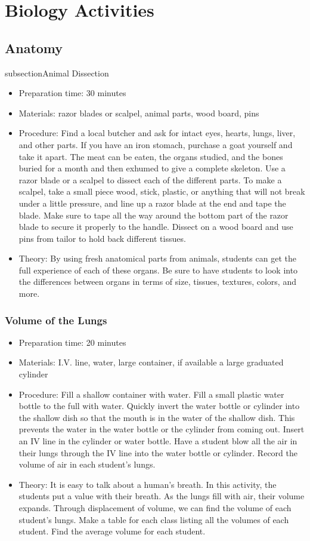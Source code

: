 \chapter{Biology Activities}

\section{Anatomy}

subsection{Animal Dissection}
\begin{itemize}
\item{Preparation time: 30 minutes}
\item{Materials: razor blades or scalpel, animal parts, wood board, pins}
\item{Procedure: Find a local butcher and ask for intact eyes, hearts, lungs, liver, and other parts. If you have an iron stomach, purchase a goat yourself and take it apart. The meat can be eaten, the organs studied, and the bones buried for a month and then exhumed to give a complete skeleton. Use a razor blade or a scalpel to dissect each of the different parts. To make a scalpel, take a small piece wood, stick, plastic, or anything that will not break under a little pressure, and line up a razor blade at the end and tape the blade. Make sure to tape all the way around the bottom part of the razor blade to secure it properly to the handle. Dissect on a wood board and use pins from tailor to hold back different tissues.}
\item{Theory: By using fresh anatomical parts from animals, students can get the full experience of each of these organs. Be sure to have students to look into the differences between organs in terms of size, tissues, textures, colors, and more.}
\end{itemize}

\subsection{Volume of the Lungs}
\begin{itemize}
\item{Preparation time: 20 minutes}
\item{Materials: I.V. line, water, large container, if available a large graduated cylinder}
\item{Procedure: Fill a shallow container with water. Fill a small plastic water bottle to the full with water. Quickly invert the water bottle or cylinder into the shallow dish so that the mouth is in the water of the shallow dish. This prevents the water in the water bottle or the cylinder from coming out. Insert an IV line in the cylinder or water bottle. Have a student blow all the air in their lungs through the IV line into the water bottle or cylinder. Record the volume of air in each student’s lungs.}
\item{Theory: It is easy to talk about a human’s breath. In this activity, the students put a value with their breath. As the lungs fill with air, their volume expands. Through displacement of volume, we can find the volume of each student’s lungs. Make a table for each class listing all the volumes of each student. Find the average volume for each student.}
\end{itemize}

